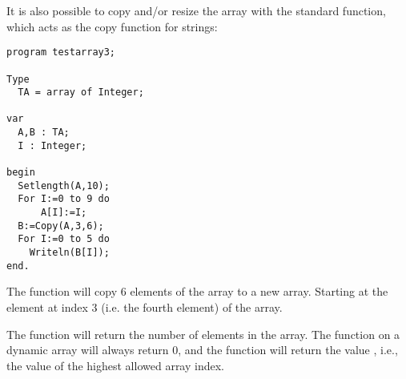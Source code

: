 It is also possible to copy and/or resize the array with the standard 
 function, which acts as the copy function for strings:
\begin{verbatim}
program testarray3;

Type
  TA = array of Integer;
  
var   
  A,B : TA;
  I : Integer;

begin
  Setlength(A,10);
  For I:=0 to 9 do
      A[I]:=I;
  B:=Copy(A,3,6);    
  For I:=0 to 5 do
    Writeln(B[I]);
end.  
\end{verbatim}
The  function will copy 6 elements of the array to a new array.
Starting at the element at index 3 (i.e. the fourth element) of the array.

The  function will return the number of elements in the array.
The  function on a dynamic array will always return 0, and the
 function will return the value , i.e., the value of the
highest allowed array index. 

